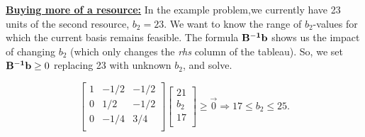 \begin{comment}
These tableaus represent optimal, feasible solutions. The optimal basis has $BV= (x^{s}_4, x_1, x_2)$, $\mathbf{B} = \left[\begin{array}{ccc}
    1 & 2 & 2 \\
    0 & 3 & 2 \\
    0 & 1 & 2 \\
\end{array} \right]$, and $\mathbf{c_B} = [0,~18,~16]$. Note that in the dual tableau the row zero does does not have the right signs for the primal variable values.  The formula is $\mathbf{c_B}\mathbf{B^{-1}}\mathbf{a_i}-c_i$, for the columns of the slack variables, this reduces to $\mathbf{c_B}\mathbf{B^{-1}}\mathbf{a_i}$ and $\mathbf{a_i}$ is all zeros except one element of $-1$.  Consider the columns for the non-slack variables ($w_1, w_2, w_3$), here $\mathbf{c_B}\mathbf{B^{-1}}\mathbf{a_i}$ represents the amount of resource used minus the number of resources (the $c_i$ in this case), which will always be non-positive in an optimal solution (and represents the negative of the corresponding slack variable).\\

Given this, the Simplex algorithm can be thought of in terns of the KKT conditions, it always satisfies two of those conditions, primal feasibility and complementary slackness (based on our definition of the dual variables, i.e., $w=c_BB^{-1}$.  The algorithm them moves towards dual feasibility (our optimality check), thus the row-zero optimality conditions only hold because the other two optimality conditions are always satisfied.  Given this, we can look at other algorithms.
\end{comment}









\bigskip  \underline{\bf Buying more of a resource:} In the example problem,we currently have 23 units of the second resource, $b_2 = 23$. We want to know the range of $b_2$-values for which the current basis remains feasible. The formula ${\bf B^{-1}b}$ shows us the impact of changing $b_2$ (which only changes the {\it rhs} column of the tableau). So, we set ${\bf B^{-1}b} \ge 0$ replacing 23 with unknown $b_2$, and solve.

$$\left[\begin{array}{ccc} 1 & -1/2 & -1/2 \\  0 & 1/2 & -1/2 \\  0 & -1/4 & 3/4 \\
\end{array}\right] \left[\begin{array}{c} 21 \\  b_2 \\  17  \\ \end{array} \right] \ge \vec{0} \Rightarrow 17 \le b_2 \le 25.$$ \\

